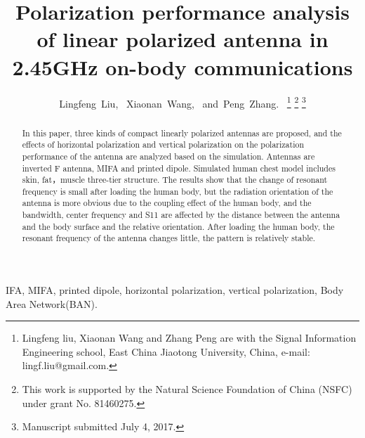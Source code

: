 \documentclass[journal]{IEEEtran}
\begin{document}
\title{Polarization performance analysis of linear polarized antenna in 2.45GHz on-body communications}

\author{Lingfeng~Liu,~\IEEEmembership{}
        Xiaonan~Wang,~\IEEEmembership{}
        and~Peng~Zhang.~\IEEEmembership{}
\thanks{Lingfeng liu, Xiaonan Wang and Zhang Peng are with the Signal Information Engineering school, East China Jiaotong
University, China, e-mail: lingf.liu@gmail.com.}%
\thanks{This work is supported by the Natural Science Foundation of China (NSFC) under grant No. 81460275.}%
\thanks{Manuscript submitted July 4, 2017.}}


\maketitle

\begin{abstract}
In this paper, three kinds of compact linearly polarized antennas are proposed, and the effects of horizontal polarization and vertical polarization on the polarization performance of the antenna are analyzed based on the simulation. Antennas are inverted F antenna, MIFA and printed dipole. Simulated human chest model includes skin, fat，muscle three-tier structure. The results show that the change of resonant frequency is small after loading the human body, but the radiation orientation of the antenna is more obvious due to the coupling effect of the human body, and the bandwidth, center frequency and S11 are affected by the distance between the antenna and the body surface and the relative orientation. After loading the human body, the resonant frequency of the antenna changes little, the pattern is relatively stable.
\end{abstract}

\begin{IEEEkeywords}
IFA, MIFA, printed dipole, horizontal polarization, vertical polarization, Body Area Network(BAN).
\end{IEEEkeywords}

\IEEEpeerreviewmaketitle
\end{document}
